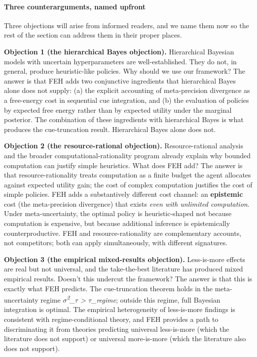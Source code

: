 \documentclass{article}
\begin{document}
\paragraph{Three counterarguments, named
upfront}\label{three-counterarguments-named-upfront}

Three objections will arise from informed readers, and we name them now
so the rest of the section can address them in their proper places.

\textbf{Objection 1 (the hierarchical Bayes objection).} Hierarchical
Bayesian models with uncertain hyperparameters are well-established.
They do not, in general, produce heuristic-like policies. Why should we
use our framework? The answer is that FEH adds two conjunctive
ingredients that hierarchical Bayes alone does not supply: (a) the
explicit accounting of meta-precision divergence as a free-energy cost
in sequential cue integration, and (b) the evaluation of policies by
expected free energy rather than by expected utility under the marginal
posterior. The combination of these ingredients with hierarchical Bayes
is what produces the cue-truncation result. Hierarchical Bayes alone
does not.

\textbf{Objection 2 (the resource-rational objection).}
Resource-rational analysis \cite{lieder2020} and the broader
computational-rationality program already explain why bounded
computation can justify simple heuristics. What does FEH add? The answer
is that resource-rationality treats computation as a finite budget the
agent allocates against expected utility gain; the cost of complex
computation justifies the cost of simple policies. FEH adds a
substantively different cost channel: an \textbf{epistemic} cost (the
meta-precision divergence) that exists \emph{even with unlimited
computation}. Under meta-uncertainty, the optimal policy is
heuristic-shaped not because computation is expensive, but because
additional inference is epistemically counterproductive. FEH and
resource-rationality are complementary accounts, not competitors; both
can apply simultaneously, with different signatures.

\textbf{Objection 3 (the empirical mixed-results objection).}
Less-is-more effects are real but not universal, and the take-the-best
literature has produced mixed empirical results. Doesn't this undercut
the framework? The answer is that this is exactly what FEH predicts. The
cue-truncation theorem holds in the meta-uncertainty regime \emph{\ensuremath{\sigma}\textsuperscript{2}\_\ensuremath{\tau}
\textgreater{} \ensuremath{\tau}\_regime}; outside this regime, full Bayesian
integration is optimal. The empirical heterogeneity of less-is-more
findings is consistent with regime-conditional theory, and FEH provides
a path to discriminating it from theories predicting universal
less-is-more (which the literature does not support) or universal
more-is-more (which the literature also does not support).
\end{document}
